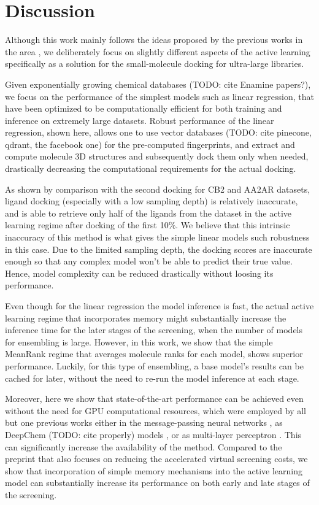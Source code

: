 \section{Discussion}

Although this work mainly follows the ideas proposed by the previous works in the area \cite{deepdocking, logistic_regression, Yang2021_shoichet_active_learning, Graff2021AcceleratingLearning}, we deliberately focus on slightly different aspects of the active learning specifically as a solution for the small-molecule docking for ultra-large libraries. 

Given exponentially growing chemical databases (TODO: cite Enamine papers?), we focus on the performance of the simplest models such as linear regression, that have been optimized to be computationally efficient for both training and inference on extremely large datasets. Robust performance of the linear regression, shown here, allows one to use vector databases (TODO: cite pinecone, qdrant, the facebook one) for the pre-computed fingerprints, and extract and compute molecule 3D structures and subsequently dock them only when needed, drastically decreasing the computational requirements for the actual docking.

As shown by comparison with the second docking for CB2 and AA2AR datasets, ligand docking (especially with a low sampling depth) is relatively inaccurate, and is able to retrieve only half of the ligands from the dataset in the active learning regime after docking of the first 10\%. We believe that this intrinsic inaccuracy of this method is what gives the simple linear models such robustness in this case. Due to the limited sampling depth, the docking scores are inaccurate enough so that any complex model won't be able to predict their true value. Hence, model complexity can be reduced drastically without loosing its performance.

Even though for the linear regression the model inference is fast, the actual active learning regime that incorporates memory might substantially increase the inference time for the later stages of the screening, when the number of models for ensembling is large. However, in this work, we show that the simple MeanRank regime that averages molecule ranks for each model, shows superior performance. Luckily, for this type of ensembling, a base model's results can be cached for later, without the need to re-run the model inference at each stage.

Moreover, here we show that state-of-the-art performance can be achieved even without the need for GPU computational resources, which were employed by all but one previous works either in the message-passing neural networks \cite{Graff2021AcceleratingLearning}, as DeepChem (TODO: cite properly) models \cite{Yang2021_shoichet_active_learning}, or as multi-layer perceptron \cite{deepdocking}. This can significantly increase the availability of the method. Compared to the preprint \cite{logistic_regression} that also focuses on reducing the accelerated virtual screening costs, we show that incorporation of simple memory mechanisms into the active learning model can substantially increase its performance on both early and late stages of the screening.




